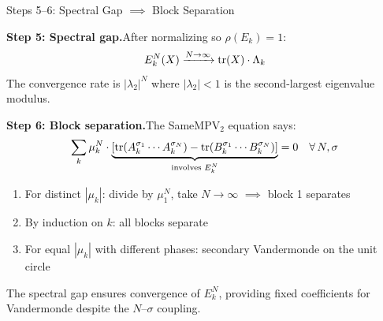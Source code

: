 \documentclass[aspectratio=169,10pt]{beamer}
\begin{document}
\begin{frame}{Steps 5--6: Spectral Gap $\implies$ Block Separation}

\textbf{Step 5: Spectral gap.}\quad After normalizing so $\rho(E_k) = 1$:
\[
E_k^N(X) \xrightarrow{N\to\infty}  \mathrm{tr}(X) \cdot \Lambda_k
\]
The convergence rate is $|\lambda_2|^N$ where $|\lambda_2| < 1$ is the second-largest eigenvalue modulus.

\vspace{0.5em}
\textbf{Step 6: Block separation.}\quad The SameMPV$_2$ equation says:
\[
\sum_k \mu_k^N \cdot \underbrace{[\mathrm{tr}(A_k^{\sigma_1}\cdots A_k^{\sigma_N}) - \mathrm{tr}(B_k^{\sigma_1}\cdots B_k^{\sigma_N})]}_{\text{involves } E_k^N}= 0 \quad \forall\, N, \sigma
\]

\begin{enumerate}\small
  \item For distinct $|\mu_k|$: divide by $\mu_1^N$, take $N \to \infty$ $\implies$ block 1 separates
  \item By induction on $k$: all blocks separate
  \item For equal $|\mu_k|$ with different phases: secondary Vandermonde on the unit circle
\end{enumerate}

\vspace{0.3em}
{\footnotesize \textcolor{dimwhite}{The spectral gap ensures convergence of $E_k^N$, providing fixed coefficients for Vandermonde despite the $N$--$\sigma$ coupling.}}
\end{frame}
\end{document}
